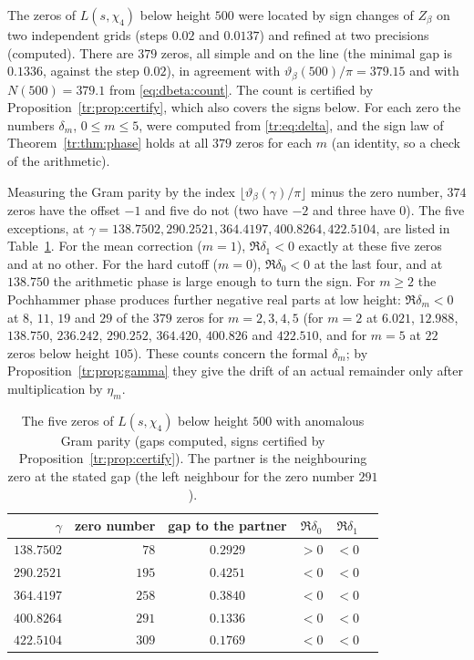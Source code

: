 \begin{resultpar}\label{tr:res:gram}
The zeros of $L(s,\chi_4)$ below height $500$ were located by sign changes of $Z_\beta$ on two independent grids (steps $0.02$ and $0.0137$) and refined at two precisions (computed). There are $379$ zeros, all simple and on the line (the minimal gap is $0.1336$, against the step $0.02$), in agreement with $\vartheta_\beta(500)/\pi=379.15$ and with $N(500)=379.1$ from \eqref{eq:dbeta:count}. The count is certified by Proposition~\ref{tr:prop:certify}, which also covers the signs below. For each zero the numbers $\delta_m$, $0\le m\le5$, were computed from \eqref{tr:eq:delta}, and the sign law of Theorem~\ref{tr:thm:phase} holds at all $379$ zeros for each $m$ (an identity, so a check of the arithmetic).

Measuring the Gram parity by the index $\lfloor\vartheta_\beta(\gamma)/\pi\rfloor$ minus the zero number, $374$ zeros have the offset $-1$ and five do not (two have $-2$ and three have $0$). The five exceptions, at $\gamma=138.7502,290.2521,364.4197,400.8264,422.5104$, are listed in Table~\ref{tr:tab:gram}. For the mean correction ($m=1$), $\Re\delta_1<0$ exactly at these five zeros and at no other. For the hard cutoff ($m=0$), $\Re\delta_0<0$ at the last four, and at $138.750$ the arithmetic phase is large enough to turn the sign. For $m\ge2$ the Pochhammer phase produces further negative real parts at low height: $\Re\delta_m<0$ at $8$, $11$, $19$ and $29$ of the $379$ zeros for $m=2,3,4,5$ (for $m=2$ at $6.021$, $12.988$, $138.750$, $236.242$, $290.252$, $364.420$, $400.826$ and $422.510$, and for $m=5$ at $22$ zeros below height $105$). These counts concern the formal $\delta_m$; by Proposition~\ref{tr:prop:gamma} they give the drift of an actual remainder only after multiplication by $\eta_m$.\end{resultpar}

\begin{table}[h]\centering\small
\begin{tabular}{rrcccc}
\toprule
$\gamma$ & zero number & gap to the partner & $\Re\delta_0$ & $\Re\delta_1$\\
\midrule
$138.7502$ & $78$ & $0.2929$ & $>0$ & $<0$\\
$290.2521$ & $195$ & $0.4251$ & $<0$ & $<0$\\
$364.4197$ & $258$ & $0.3840$ & $<0$ & $<0$\\
$400.8264$ & $291$ & $0.1336$ & $<0$ & $<0$\\
$422.5104$ & $309$ & $0.1769$ & $<0$ & $<0$\\
\bottomrule
\end{tabular}
\caption{The five zeros of $L(s,\chi_4)$ below height $500$ with anomalous Gram parity (gaps computed, signs certified by Proposition~\ref{tr:prop:certify}). The partner is the neighbouring zero at the stated gap (the left neighbour for the zero number $291$).}\label{tr:tab:gram}
\end{table}

